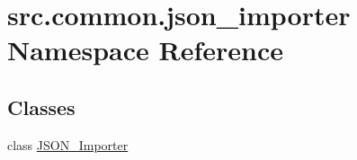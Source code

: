 \hypertarget{namespacesrc_1_1common_1_1json__importer}{}\section{src.\+common.\+json\+\_\+importer Namespace Reference}
\label{namespacesrc_1_1common_1_1json__importer}
\subsection*{Classes}
\begin{DoxyCompactItemize}
\item 
class \hyperlink{classsrc_1_1common_1_1json__importer_1_1JSON__Importer}{J\+S\+O\+N\+\_\+\+Importer}
\end{DoxyCompactItemize}
